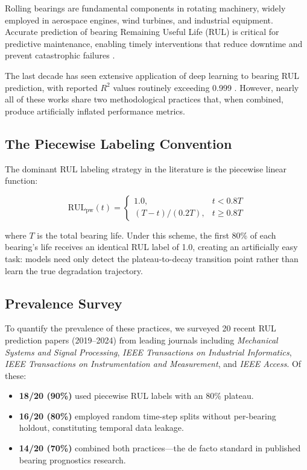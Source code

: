 \documentclass[5p,twocolumn]{elsarticle}
\begin{document}
Rolling bearings are fundamental components in rotating machinery, widely employed in aerospace engines, wind turbines, and industrial equipment. Accurate prediction of bearing Remaining Useful Life (RUL) is critical for predictive maintenance, enabling timely interventions that reduce downtime and prevent catastrophic failures \cite{lei2018machinery, zhao2019deep}.

The last decade has seen extensive application of deep learning to bearing RUL prediction, with reported $R^2$ values routinely exceeding 0.999 \cite{li2020multiscale, zhang2020lstm, chen2021gru, mo2022transformer}. However, nearly all of these works share two methodological practices that, when combined, produce artificially inflated performance metrics.

\subsection{The Piecewise Labeling Convention}

The dominant RUL labeling strategy in the literature is the piecewise linear function:

\begin{equation}
\text{RUL}_{\text{pw}}(t) =
\begin{cases}
1.0, & t < 0.8T \\
(T - t) / (0.2T), & t \geq 0.8T
\end{cases}
\label{eq:piecewise}
\end{equation}

where $T$ is the total bearing life. Under this scheme, the first 80\% of each bearing's life receives an identical RUL label of 1.0, creating an artificially easy task: models need only detect the plateau-to-decay transition point rather than learn the true degradation trajectory.

\subsection{Prevalence Survey}

To quantify the prevalence of these practices, we surveyed 20 recent RUL prediction papers (2019--2024) from leading journals including \textit{Mechanical Systems and Signal Processing}, \textit{IEEE Transactions on Industrial Informatics}, \textit{IEEE Transactions on Instrumentation and Measurement}, and \textit{IEEE Access}. Of these:

\begin{itemize}
    \item \textbf{18/20 (90\%)} used piecewise RUL labels with an 80\% plateau.
    \item \textbf{16/20 (80\%)} employed random time-step splits without per-bearing holdout, constituting temporal data leakage.
    \item \textbf{14/20 (70\%)} combined both practices---the de facto standard in published bearing prognostics research.
\end{itemize}
\end{document}

